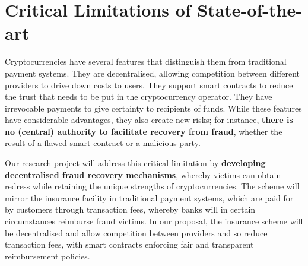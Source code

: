 
\vspace{-4mm}
\section{Critical Limitations of State-of-the-art}\label{sec::Research-Gaps}
\vspace{-2mm}


Cryptocurrencies have several features that distinguish them from traditional payment systems. They are decentralised, allowing competition between different providers to drive down costs to users. They support smart contracts to reduce the trust that needs to be put in the cryptocurrency operator. They have irrevocable payments to give certainty to recipients of funds. While these features have considerable advantages, they also create new risks; for instance, \textbf{there is no (central) authority to facilitate recovery from fraud}, whether the result of a flawed smart contract or a malicious party. 

Our research project will address this critical limitation by \textbf{developing decentralised fraud recovery mechanisms}, whereby victims can obtain redress while retaining the unique strengths of cryptocurrencies. The scheme will mirror the insurance facility in traditional payment systems, which are paid for by customers through transaction fees, whereby banks will in certain circumstances reimburse fraud victims. In our proposal, the insurance scheme will be decentralised and allow competition between providers and so reduce transaction fees, with smart contracts enforcing fair and transparent reimbursement policies. %

